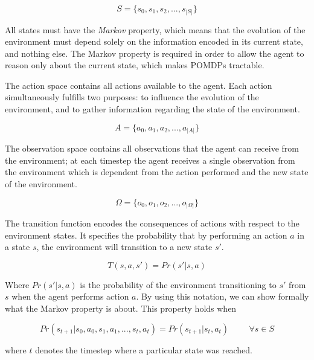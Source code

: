 \begin{equation}
 S = \{s_0, s_1, s_2, ..., s_{|S|}\}
\end{equation}

All states must have the \textit{Markov} property, which means that the evolution of the environment
must depend solely on the information encoded in its current state, and nothing else. The Markov
property is required in order to allow the agent to reason only about the current state, which makes
POMDPs tractable.

The action space contains all actions available to the agent. Each action simultaneously fulfills
two purposes: to influence the evolution of the environment, and to gather information regarding the
state of the environment.

\begin{equation}
 A = \{ a_0, a_1, a_2, ..., a_{|A|} \}
\end{equation}

The observation space contains all observations that the agent can receive from the environment; at
each timestep the agent receives a single observation from the environment which is dependent from
the action performed and the new state of the environment.

\begin{equation}
 \Omega = \{ o_0, o_1, o_2, ..., o_{|\Omega|} \}
\end{equation}

The transition function encodes the consequences of actions with respect to the environment states.
It specifies the probability that by performing an action $a$ in a state $s$, the
environment will transition to a new state $s'$.

\begin{equation}
 T(s, a, s') = Pr(s' | s, a)
\end{equation}

Where $Pr(s'|s,a)$ is the probability of the environment transitioning to $s'$ from $s$ when the
agent performs action $a$. By using this notation, we can show formally what the Markov property is
about. This property holds when

\begin{equation}
 Pr(s_{t+1} | s_{0}, a_{0}, s_{1}, a_{1}, ..., s_{t}, a_{t} ) = Pr(s_{t+1} | s_t, a_t ) \hspace{1cm} \forall s \in S
\end{equation}

where $t$ denotes the timestep where a particular state was reached.

